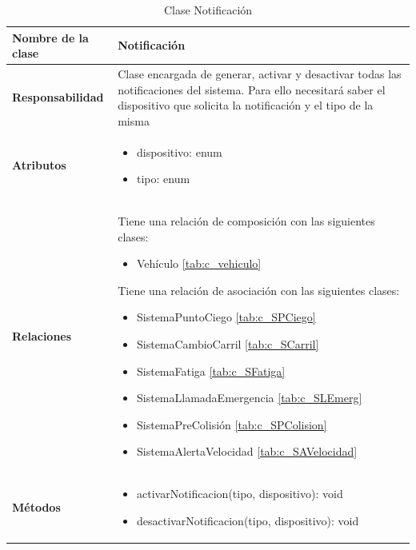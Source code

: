 \begin{table}[h]
\begin{center}
\begin{tabular}{p{} p{11cm}}
\textbf{Nombre de la clase} &  Notificación\\ \hline \hline
\textbf{Responsabilidad} &   Clase encargada de generar, activar y desactivar todas las notificaciones del sistema. Para ello necesitará saber el dispositivo que solicita la notificación y el tipo de la misma  \\ \hline
\textbf{Atributos} & \begin{itemize}
                      \item dispositivo: enum
                      \item tipo: enum
                    \end{itemize}\\ \hline
\textbf{Relaciones} & \par Tiene una relación de composición con las siguientes clases:
                      \begin{itemize}
                        \item Vehículo \ref{tab:c_vehiculo}
                      \end{itemize}

                      \par Tiene una relación de asociación con las siguientes clases:
                      \begin{itemize}
                        \item SistemaPuntoCiego \ref{tab:c_SPCiego}
                        \item SistemaCambioCarril \ref{tab:c_SCarril}
                        \item SistemaFatiga \ref{tab:c_SFatiga}
                        \item SistemaLlamadaEmergencia \ref{tab:c_SLEmerg}
                        \item SistemaPreColisión \ref{tab:c_SPColision}
                        \item SistemaAlertaVelocidad \ref{tab:c_SAVelocidad}
                      \end{itemize}

                      \\ \hline

\textbf{Métodos} &  \begin{itemize}
                      \item activarNotificacion(tipo, dispositivo): void
                      \item desactivarNotificacion(tipo, dispositivo): void
                    \end{itemize}\\ \hline
\end{tabular}
\caption{Clase Notificación}
\label{tab:c_Notificacion}
\end{center}
\end{table}
